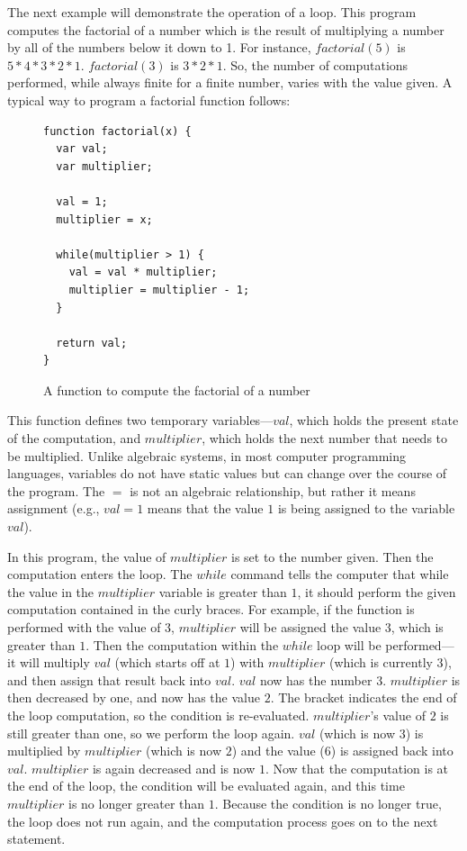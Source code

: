 The next example will demonstrate the operation of a loop.  This program computes the factorial of a number which is the result of multiplying a number by all of the numbers below it down to 1.  For instance, $factorial(5)$ is $5 * 4 * 3 * 2 * 1$.  $factorial(3)$ is $3 * 2 * 1$.  So, the number of computations performed, while always finite for a finite number, varies with the value given.  A typical way to program a factorial function follows:

\begin{figure}[H]
\begin{mdframed}
\begin{verbatim}
function factorial(x) {
  var val;
  var multiplier;

  val = 1;
  multiplier = x;

  while(multiplier > 1) {
    val = val * multiplier;
    multiplier = multiplier - 1;
  }

  return val;
}
\end{verbatim}
\end{mdframed}
\caption{A function to compute the factorial of a number}
\end{figure}

This function defines two temporary variables---$val$, which holds the present state of the computation, and $multiplier$, which holds the next number that needs to be multiplied.  Unlike algebraic systems, in most computer programming languages, variables do not have static values but can change over the course of the program.  The $=$ is not an algebraic relationship, but rather it means assignment (e.g.,  $val = 1$ means that the value $1$ is being assigned to the variable $val$).  

In this program, the value of $multiplier$ is set to the number given.  Then the computation enters the loop.  The $while$ command tells the computer that while the value in the $multiplier$ variable is greater than $1$, it should perform the given computation contained in the curly braces.  For example, if the function is performed with the value of $3$, $multiplier$ will be assigned the value $3$, which is greater than $1$.  Then the computation within the $while$ loop will be performed---it will multiply $val$ (which starts off at $1$) with $multiplier$ (which is currently $3$), and then assign that result back into $val$.  $val$ now has the number $3$.  $multiplier$ is then decreased by one, and now has the value $2$.  The bracket indicates the end of the loop computation, so the condition is re-evaluated.  $multiplier$'s value of $2$ is still greater than one, so we perform the loop again.  $val$ (which is now $3$) is multiplied by $multiplier$ (which is now $2$) and the value ($6$) is assigned back into $val$.  $multiplier$ is again decreased and is now $1$.  Now that the computation is at the end of the loop, the condition will be evaluated again, and this time $multiplier$ is no longer greater than $1$.  Because the condition is no longer true, the loop does not run again, and the computation process goes on to the next statement.  

